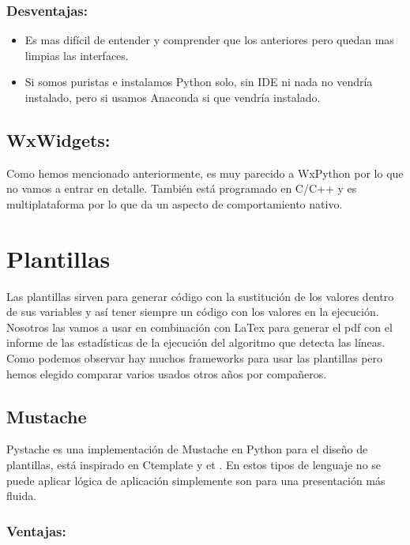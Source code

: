 \subsubsection{Desventajas:}

\begin{itemize}
\item Es mas difícil de entender y comprender que los anteriores pero quedan mas limpias las interfaces.
\item Si somos puristas e instalamos Python solo, sin IDE ni nada no vendría instalado, pero si usamos Anaconda si que vendría instalado.
\end{itemize}

\subsection{WxWidgets:}
Como hemos mencionado anteriormente, es muy parecido a WxPython por lo que no vamos a entrar en detalle. También está programado en C/C++ y es multiplataforma por lo que da un aspecto de comportamiento nativo.
\\


\section{Plantillas}
Las plantillas sirven para generar código con la sustitución de los valores dentro de sus variables y así tener siempre un código con los valores en la ejecución.\\
Nosotros las vamos a usar en combinación con LaTex para generar el pdf con el informe de las estadísticas de la ejecución del algoritmo que detecta las líneas.\\
Como podemos observar hay muchos frameworks para usar las plantillas pero hemos elegido comparar varios usados otros años por compañeros.
\subsection{Mustache}
Pystache es una implementación de Mustache en Python para el diseño de plantillas, está inspirado en Ctemplate \cite{GitHub:CTemplate} y et \cite{et}.
En estos tipos de lenguaje no se puede aplicar lógica de aplicación simplemente son para una presentación más fluida.

\subsubsection{Ventajas:}

